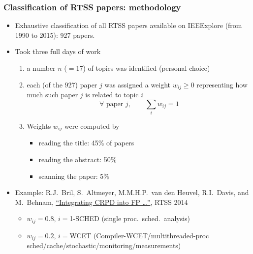\documentclass[ignorenonframetext,mathserif]{beamer} %
\begin{document}
\begin{frame}[fragile]
  \frametitle{Classification of RTSS papers: methodology}
  
  \begin{itemize}
  \item Exhaustive classification of all RTSS papers available on
    IEEExplore (from 1990 to 2015): 927 papers.  
  \item Took three full days of work
    \begin{enumerate}
    \item a number $n$ ($=17$) of topics was identified (personal
      choice)
    \item each (of the 927) paper $j$ was assigned a weight
      $w_{ij}\geq 0$ representing how much such paper $j$ is related
      to topic $i$
      \[
      \forall \text{ paper } j,\qquad\sum_i w_{ij}= 1
      \]
    \item Weights $w_{ij}$ were computed by
      \begin{itemize}
      \item reading the title: 45\% of papers
      \item reading the abstract: 50\%
      \item scanning the paper: 5\%
      \end{itemize}
    \end{enumerate}
  \item Example: R.J.~Bril, S.~Altmeyer, M.M.H.P.~van den Heuvel,
    R.I.~Davis, and M.~Behnam,
    \href{https://ieeexplore.ieee.org/stamp/stamp.jsp?tp=&arnumber=7010484}
    {``Integrating CRPD into FP \dots''}, RTSS 2014
    \begin{itemize}
    \item $w_{ij}=0.8$, $i=$1-SCHED (single proc.~sched.~analysis)
    \item $w_{ij}=0.2$, $i=$WCET (Compiler-WCET/multithreaded-proc
      sched/cache/stochastic/monitoring/measurements)
    \end{itemize}
  \end{itemize}
\end{frame}
\end{document}

